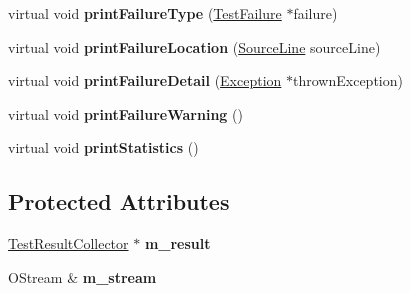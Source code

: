 \begin{DoxyCompactItemize}
\item 
virtual void {\bfseries print\+Failure\+Type} (\hyperlink{class_test_failure}{Test\+Failure} $\ast$failure)\hypertarget{class_text_outputter_a95c601c6a903700450d95e13db502247}{}\label{class_text_outputter_a95c601c6a903700450d95e13db502247}

\item 
virtual void {\bfseries print\+Failure\+Location} (\hyperlink{class_source_line}{Source\+Line} source\+Line)\hypertarget{class_text_outputter_a5ba7ad1968b180ce9593373718632af9}{}\label{class_text_outputter_a5ba7ad1968b180ce9593373718632af9}

\item 
virtual void {\bfseries print\+Failure\+Detail} (\hyperlink{class_exception}{Exception} $\ast$thrown\+Exception)\hypertarget{class_text_outputter_ae1a2ad2deebf4b12f803c59d867980f7}{}\label{class_text_outputter_ae1a2ad2deebf4b12f803c59d867980f7}

\item 
virtual void {\bfseries print\+Failure\+Warning} ()\hypertarget{class_text_outputter_a254f58361b8f5c59b60df1c007d9a438}{}\label{class_text_outputter_a254f58361b8f5c59b60df1c007d9a438}

\item 
virtual void {\bfseries print\+Statistics} ()\hypertarget{class_text_outputter_aeabfe5420c137b0a935c5b0acb45a6d8}{}\label{class_text_outputter_aeabfe5420c137b0a935c5b0acb45a6d8}

\end{DoxyCompactItemize}
\subsection*{Protected Attributes}
\begin{DoxyCompactItemize}
\item 
\hyperlink{class_test_result_collector}{Test\+Result\+Collector} $\ast$ {\bfseries m\+\_\+result}\hypertarget{class_text_outputter_a465e8c580e6f2db9ed021e1c44b95eb2}{}\label{class_text_outputter_a465e8c580e6f2db9ed021e1c44b95eb2}

\item 
O\+Stream \& {\bfseries m\+\_\+stream}\hypertarget{class_text_outputter_a947e16694e57297974e0f651d6298b80}{}\label{class_text_outputter_a947e16694e57297974e0f651d6298b80}

\end{DoxyCompactItemize}
